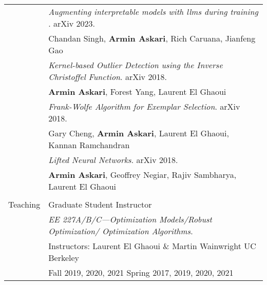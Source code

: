 \documentclass[letterpaper,10pt,oneside]{article}
\begin{document}
\begin{tabular}{@{} l l}
 		&  \textit{Augmenting interpretable models with llms during training  
}. arXiv 2023. \\
		 & \indent \small{Chandan Singh, \textbf{Armin Askari},  Rich Caruana, Jianfeng Gao}\\
      &  \textit{Kernel-based Outlier Detection using the Inverse Christoffel Function}. arXiv 2018. \\
      & \indent \small{\textbf{Armin Askari},  Forest Yang, Laurent El Ghaoui}\\
      &  \textit{Frank-Wolfe Algorithm for Exemplar Selection}. arXiv  2018. \\
      & \indent \small{Gary Cheng, \textbf{Armin Askari},  Laurent El Ghaoui, Kannan Ramchandran}\\
 &  \textit{Lifted Neural Networks}. arXiv 2018. \\
      & \indent \small{\textbf{Armin Askari},  Geoffrey Negiar, Rajiv Sambharya, Laurent El Ghaoui}\\
      & \\
  \Large{Teaching}   & Graduate Student Instructor\\
  &\textit{EE 227A/B/C---Optimization Models/Robust Optimization/ Optimization Algorithms}. \\
     & Instructors: Laurent El Ghaoui \& Martin Wainwright UC Berkeley\\
     & Fall 2019, 2020, 2021 Spring 2017, 2019, 2020, 2021 \\
\end{tabular}
\end{document}
